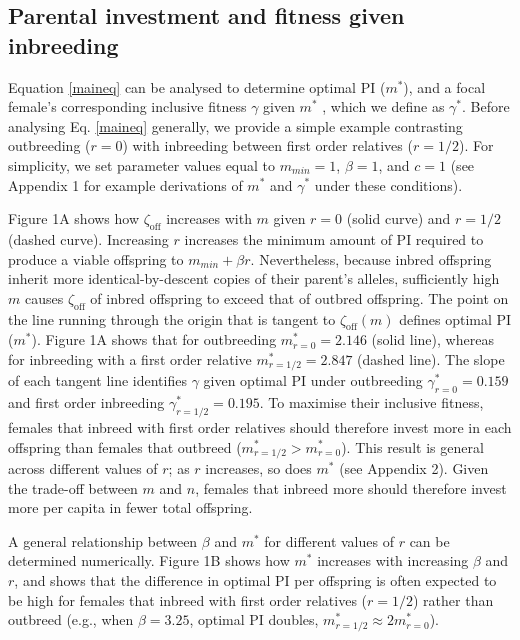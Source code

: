 \documentclass[12pt]{article}
\begin{document}
\subsection*{Parental investment and fitness given inbreeding}

Equation \ref{maineq} can be analysed to determine optimal PI ($m^{*}$), and a focal female's corresponding inclusive fitness $\gamma$ given $m^{*}$ \cite[][]{Kuijper2012}, which we define as $\gamma^{*}$. Before analysing Eq. \ref{maineq} generally, we provide a simple example contrasting outbreeding ($r=0$) with inbreeding between first order relatives ($r=1/2$). For simplicity, we set parameter values equal to $m_{min}=1$, $\beta=1$, and $c=1$ (see Appendix 1 for example derivations of $m^{*}$ and $\gamma^{*}$ under these conditions).

Figure 1A shows how $\zeta_{\textrm{off}}$ increases with $m$ given $r=0$ (solid curve) and $r=1/2$ (dashed curve). Increasing $r$ increases the minimum amount of PI required to produce a viable offspring to $m_{min}+\beta r$. Nevertheless, because inbred offspring inherit more identical-by-descent copies of their parent's alleles, sufficiently high $m$ causes $\zeta_{\textrm{off}}$ of inbred offspring to exceed that of outbred offspring. The point on the line running through the origin that is tangent to $\zeta_{\textrm{off}}(m)$ defines optimal PI ($m^{*}$). Figure 1A shows that for outbreeding $m^{*}_{r=0}=2.146$ (solid line), whereas for inbreeding with a first order relative $m^{*}_{r=1/2}=2.847$ (dashed line). The slope of each tangent line identifies $\gamma$ given optimal PI under outbreeding $\gamma^{*}_{r=0}=0.159$ and first order inbreeding $\gamma^{*}_{r=1/2}=0.195$. To maximise their inclusive fitness, females that inbreed with first order relatives should therefore invest more in each offspring than females that outbreed ($m^{*}_{r=1/2}>m^{*}_{r=0}$). This result is general across different values of $r$; as $r$ increases, so does $m^{*}$ (see Appendix 2). Given the trade-off between $m$ and $n$, females that inbreed more should therefore invest more per capita in fewer total offspring. 

A general relationship between $\beta$ and $m^{*}$ for different values of $r$ can be determined numerically. Figure 1B shows how $m^{*}$ increases with increasing $\beta$ and $r$, and shows that the difference in optimal PI per offspring is often expected to be high for females that inbreed with first order relatives ($r=1/2$) rather than outbreed (e.g., when $\beta=3.25$, optimal PI doubles, $m^{*}_{r=1/2} \approx 2m^{*}_{r=0}$).
\end{document}
